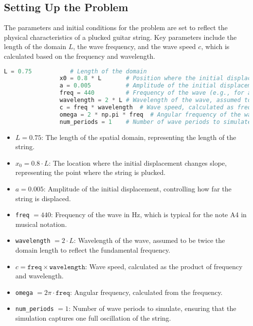 \documentclass{article}
\begin{document}
		\subsection{Setting Up the Problem}
		
			The parameters and initial conditions for the problem are set to reflect the physical characteristics of a plucked guitar string. Key parameters include the length of the domain \( L \), the wave frequency, and the wave speed \( c \), which is calculated based on the frequency and wavelength.
			
			\begin{lstlisting}[language=Python]
				L = 0.75           # Length of the domain
				x0 = 0.8 * L       # Position where the initial displacement changes slope
				a = 0.005          # Amplitude of the initial displacement
				freq = 440         # Frequency of the wave (e.g., for a sound wave)
				wavelength = 2 * L # Wavelength of the wave, assumed to be twice the domain length
				c = freq * wavelength  # Wave speed, calculated as frequency times wavelength
				omega = 2 * np.pi * freq  # Angular frequency of the wave
				num_periods = 1    # Number of wave periods to simulate
			\end{lstlisting}
			
			\begin{itemize}
				\item \( L = 0.75 \): The length of the spatial domain, representing the length of the string.
				\item \( x_0 = 0.8 \cdot L \): The location where the initial displacement changes slope, representing the point where the string is plucked.
				\item \( a = 0.005 \): Amplitude of the initial displacement, controlling how far the string is displaced.
				\item \texttt{freq} \( = 440 \): Frequency of the wave in Hz, which is typical for the note A4 in musical notation.
				\item \texttt{wavelength} \( = 2 \cdot L \): Wavelength of the wave, assumed to be twice the domain length to reflect the fundamental frequency.
				\item \( c = \texttt{freq} \times \texttt{wavelength} \): Wave speed, calculated as the product of frequency and wavelength.
				\item \texttt{omega} \( = 2 \pi \cdot \texttt{freq} \): Angular frequency, calculated from the frequency.
				\item \texttt{num\_periods} \( = 1 \): Number of wave periods to simulate, ensuring that the simulation captures one full oscillation of the string.
			\end{itemize}
			
\end{document}
